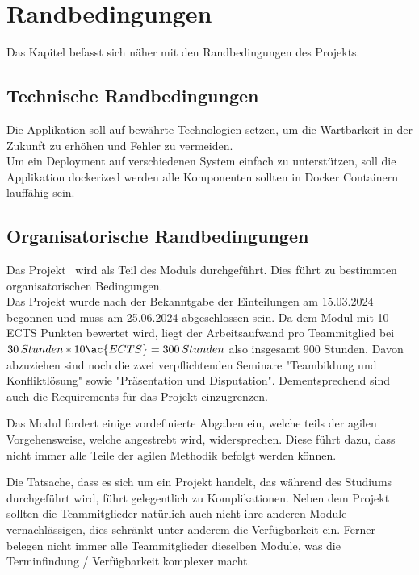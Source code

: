 \chapter{Randbedingungen}\label{ch:randbedingungen}

Das Kapitel befasst sich näher mit den Randbedingungen des Projekts.

\section{Technische Randbedingungen}\label{sec:technische-randbedingungen}

Die Applikation soll auf bewährte Technologien setzen, um die Wartbarkeit in der Zukunft zu erhöhen und Fehler zu vermeiden.\\
Um ein Deployment auf verschiedenen System einfach zu unterstützen, soll die Applikation dockerized werden
\dah alle Komponenten sollten in Docker Containern lauffähig sein.

\section{Organisatorische Randbedingungen}\label{sec:organisatorische-randbedingungen}

Das Projekt \workTitel~wird als Teil des Moduls \workTyp durchgeführt.
Dies führt zu bestimmten organisatorischen Bedingungen.\\
Das Projekt wurde nach der Bekanntgabe der Einteilungen am 15.03.2024 begonnen und muss am 25.06.2024 abgeschlossen sein.
Da dem Modul mit 10 \ac{ECTS} Punkten bewertet wird, liegt der Arbeitsaufwand pro Teammitglied bei \(30\,Stunden * 10 \ac{ECTS} = 300\,Stunden\) also insgesamt 900 Stunden.
Davon abzuziehen sind noch die zwei verpflichtenden Seminare "Teambildung und Konfliktlösung" sowie "Präsentation und Disputation".
Dementsprechend sind auch die Requirements für das Projekt einzugrenzen.

Das Modul fordert einige vordefinierte Abgaben ein, welche teils der agilen Vorgehensweise, welche angestrebt wird, widersprechen.
Diese führt dazu, dass nicht immer alle Teile der agilen Methodik befolgt werden können.

Die Tatsache, dass es sich um ein Projekt handelt, das während des Studiums durchgeführt wird, führt gelegentlich zu Komplikationen.
Neben dem Projekt sollten die Teammitglieder natürlich auch nicht ihre anderen Module vernachlässigen, dies schränkt unter anderem die Verfügbarkeit ein.
Ferner belegen nicht immer alle Teammitglieder dieselben Module, was die Terminfindung / Verfügbarkeit komplexer macht.